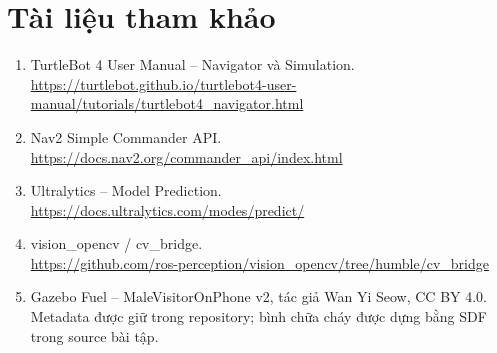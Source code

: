 \documentclass[a4paper,11pt]{article}
\begin{document}
\section*{Tài liệu tham khảo}
\begin{enumerate}
\item TurtleBot 4 User Manual -- Navigator và Simulation.\\
\url{https://turtlebot.github.io/turtlebot4-user-manual/tutorials/turtlebot4_navigator.html}
\item Nav2 Simple Commander API.\\\url{https://docs.nav2.org/commander_api/index.html}
\item Ultralytics -- Model Prediction.\\\url{https://docs.ultralytics.com/modes/predict/}
\item vision\_opencv / cv\_bridge.\\\url{https://github.com/ros-perception/vision_opencv/tree/humble/cv_bridge}
\item Gazebo Fuel -- MaleVisitorOnPhone v2, tác giả Wan Yi Seow, CC BY 4.0. Metadata được giữ trong repository; bình chữa cháy được dựng bằng SDF trong source bài tập.
\end{enumerate}
\end{document}
